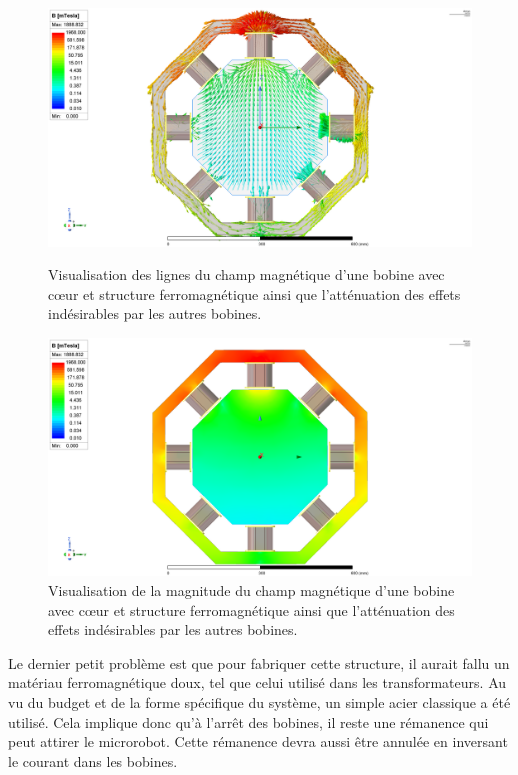 \documentclass{article}
\begin{document}
\begin{figure}[H]
    \centering
    \begin{minipage}{0.45\textwidth}
        \centering
        \includegraphics[width=\linewidth]{Images/B1-5_B2-0,8_B3-0,1_B4-0,04_B5-0,03_B6-0,04_B7-0,1_B8-0,8.png}
        \caption{Visualisation des lignes du champ magnétique d'une bobine avec cœur et structure ferromagnétique ainsi que l'atténuation des effets indésirables par les autres bobines.}
    \end{minipage}\hfill
    \begin{minipage}{0.45\textwidth}
        \centering
        \includegraphics[width=\linewidth]{Images/B1-5_B2-0,8_B3-0,1_B4-0,04_B5-0,03_B6-0,04_B7-0,1_B8-0,8_Magnitude.png}
        \caption{Visualisation de la magnitude du champ magnétique d'une bobine avec cœur et structure ferromagnétique ainsi que l'atténuation des effets indésirables par les autres bobines.}
    \end{minipage}\hfill

\end{figure}
\noindent
Le dernier petit problème est que pour fabriquer cette structure, il aurait fallu un matériau ferromagnétique doux, tel que celui utilisé dans les transformateurs. Au vu du budget et de la forme spécifique du système, un simple acier classique a été utilisé. Cela implique donc qu'à l'arrêt des bobines, il reste une rémanence qui peut attirer le microrobot. Cette rémanence devra aussi être annulée en inversant le courant dans les bobines.
\end{document}
